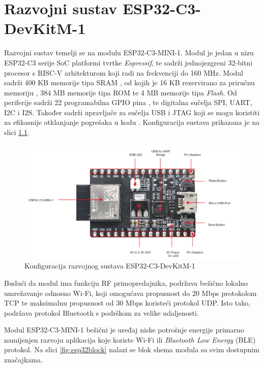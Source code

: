 \chapter{Razvojni sustav ESP32-C3-DevKitM-1}

Razvojni sustav temelji se na modulu ESP32-C3-MINI-1. Modul je jedan u nizu ESP32-­C3 serije SoC  platformi tvrtke \textit{Espressif}, te sadrži jednojezgreni 32-bitni procesor s RISC-V arhitekturom koji radi na frekvenciji do 160 MHz. Modul sadrži 400 KB memorije tipa SRAM , od kojih je 16 KB rezervirano za priručnu memoriju , 384 MB memorije tipa ROM  te 4 MB memorije tipa \textit{Flash}. Od periferije sadrži 22 programabilna GPIO pina , te digitalna sučelja SPI, UART, I2C i I2S. Također sadrži upravljače za sučelja USB i JTAG koji se mogu koristiti za efikasnije otklanjanje pogrešaka u kodu . Konfiguracija sustava prikazana je na slici \ref{fig:esp32}. \cite{esp32manual}

\begin{figure}[ht]
	\centering
	\includegraphics[scale=0.6]{imgs/esp32}
	\caption{Konfiguracija razvojnog sustava ESP32-C3-DevKitM-1 \cite{espressif}}
	\label{fig:esp32}
\end{figure}

Budući da modul ima funkciju RF  primopredajnika, podržava bežično lokalno umrežavanje odnosno Wi-Fi, koji omogućava propusnost do 20 Mbps protokolom TCP te maksimalnu propusnost od 30 Mbps koristeći protokol UDP. Isto tako, podržava protokol Bluetooth s podrškom za velike udaljenosti. 

Modul ESP32-C3-MINI-1 bežični je uređaj niske potrošnje energije  primarno namijenjen razvoju aplikacija koje koriste Wi-Fi ili \textit{Bluetooth Low Energy} (BLE) protokol. Na slici \ref{fig:esp32block} nalazi se blok shema modula sa svim dostupnim značajkama. 

